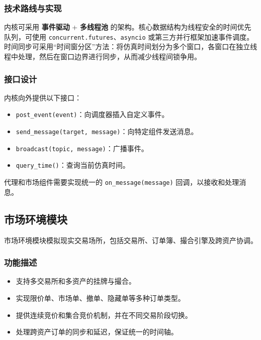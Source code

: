 \subsubsection{技术路线与实现}
内核可采用 \textbf{事件驱动} + \textbf{多线程池} 的架构。核心数据结构为线程安全的时间优先队列，可使用 \verb|concurrent.futures|、\verb|asyncio| 或第三方并行框架加速事件调度。时间同步可采用“时间窗分区”方法：将仿真时间划分为多个窗口，各窗口在独立线程中处理，然后在窗口边界进行同步，从而减少线程间锁争用。

\subsubsection{接口设计}
内核向外提供以下接口：
\begin{itemize}
  \item \verb|post_event(event)|：向调度器插入自定义事件。
  \item \verb|send_message(target, message)|：向特定组件发送消息。
  \item \verb|broadcast(topic, message)|：广播事件。
  \item \verb|query_time()|：查询当前仿真时间。
\end{itemize}
代理和市场组件需要实现统一的 \verb|on_message(message)| 回调，以接收和处理消息。

\subsection{市场环境模块}

市场环境模块模拟现实交易场所，包括交易所、订单簿、撮合引擎及跨资产协调。

\subsubsection{功能描述}
\begin{itemize}
  \item 支持多交易所和多资产的挂牌与撮合。
  \item 实现限价单、市场单、撤单、隐藏单等多种订单类型。
  \item 提供连续竞价和集合竞价机制，并在不同交易阶段切换。
  \item 处理跨资产订单的同步和延迟，保证统一的时间轴。
\end{itemize}

